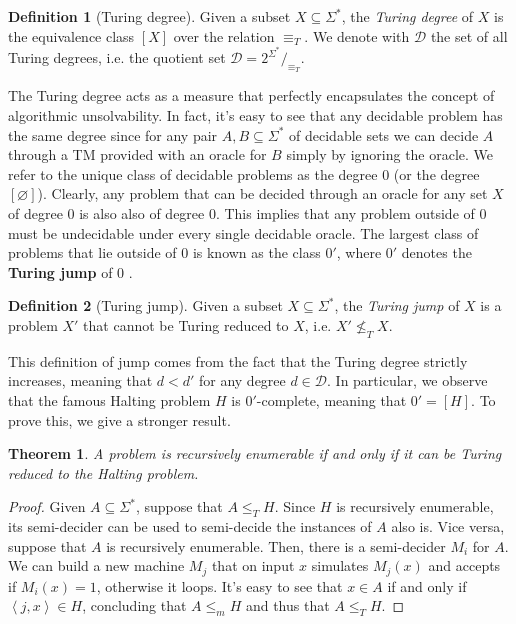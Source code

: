 \documentclass[12pt,a4paper]{article}
\newtheorem{theorem}{Theorem}
\theoremstyle{definition}
\newtheorem{definition}{Definition}
\newcommand{\abk}[1]{\left\langle#1\right\rangle}
\begin{document}
    \begin{definition}[Turing degree]
        Given a subset $X \subseteq \Sigma^*$, the \textit{Turing degree} of $X$ is the equivalence class $[X]$ over the relation $\equiv_T$. We denote with $\mathcal{D}$ the set of all Turing degrees, i.e. the quotient set $\mathcal{D} = 2^{\Sigma^*}/_{\equiv_T}$.
    \end{definition}

    The Turing degree acts as a measure that perfectly encapsulates the concept of algorithmic unsolvability. In fact, it's easy to see that any decidable problem has the same degree since for any pair $A,B \subseteq \Sigma^*$ of decidable sets we can decide $A$ through a TM provided with an oracle for $B$ simply by ignoring the oracle. We refer to the unique class of decidable problems as the degree $0$ (or the degree $[\varnothing]$). Clearly, any problem that can be decided through an oracle for any set $X$ of degree 0 is also also of degree 0. This implies that any problem outside of 0 must be undecidable under every single decidable oracle. The largest class of problems that lie outside of 0 is known as the class $0'$, where $0'$ denotes the \textbf{Turing jump} of 0 \cite{soare_1,soare_2}. 
    
    \begin{definition}[Turing jump]
        Given a subset $X \subseteq \Sigma^*$, the \textit{Turing jump} of $X$ is a problem $X'$ that cannot be Turing reduced to $X$, i.e. $X' \not\leq_T X$.
    \end{definition}

    This definition of jump comes from the fact that the Turing degree strictly increases, meaning that $d < d'$ for any degree $d \in \mathcal{D}$. In particular, we observe that the famous Halting problem $H$ is $0'$-complete, meaning that $0' = [H]$. To prove this, we give a stronger result. 

    \begin{theorem}
        A problem is recursively enumerable if and only if it can be Turing reduced to the Halting problem.
    \end{theorem}

    \begin{proof}
        Given $A \subseteq \Sigma^*$, suppose that $A \leq_T H$. Since $H$ is recursively enumerable, its semi-decider can be used to semi-decide the instances of $A$ also is. Vice versa, suppose that $A$ is recursively enumerable. Then, there is a semi-decider $M_i$ for $A$. We can build a new machine $M_j$ that on input $x$ simulates $M_j(x)$ and accepts if $M_i(x) = 1$, otherwise it loops. It's easy to see that $x \in A$ if and only if $\abk{j, x} \in H$, concluding that $A \leq_m H$ and thus that $A \leq_T H$.
    \end{proof}
\end{document}
